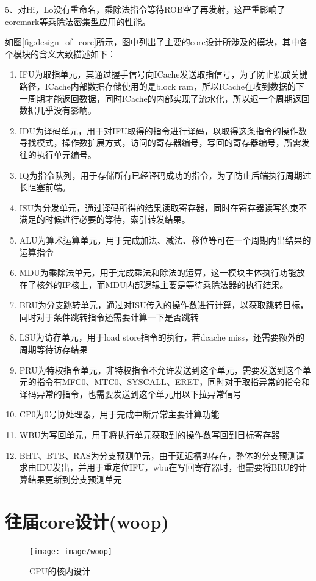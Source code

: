 \documentclass[lang=cn,11pt,a4paper]{elegantpaper}
\begin{document}
5、对Hi，Lo没有重命名，乘除法指令等待ROB空了再发射，这严重影响了coremark等乘除法密集型应用的性能。



如图\ref{fig:design_of_core}所示，图中列出了主要的core设计所涉及的模块，其中各个模块的含义大致描述如下：

\begin{enumerate}
\item IFU为取指单元，其通过握手信号向ICache发送取指信号，为了防止照成关键路径，ICache内部数据存储使用的是block ram，所以ICache在收到数据的下一周期才能返回数据，同时ICache的内部实现了流水化，所以迟一个周期返回数据几乎没有影响。

\item IDU为译码单元，用于对IFU取得的指令进行译码，以取得这条指令的操作数寻找模式，操作数扩展方式，访问的寄存器编号，写回的寄存器编号，所需发往的执行单元编号。

\item IQ为指令队列，用于存储所有已经译码成功的指令，为了防止后端执行周期过长阻塞前端。

\item ISU为分发单元，通过译码所得的结果读取寄存器，同时在寄存器读写约束不满足的时候进行必要的等待，索引转发结果。

\item ALU为算术运算单元，用于完成加法、减法、移位等可在一个周期内出结果的运算指令

\item MDU为乘除法单元，用于完成乘法和除法的运算，这一模块主体执行功能放在了核外的IP核上，而MDU内部逻辑主要是等待乘除法器的执行结果。

\item BRU为分支跳转单元，通过对ISU传入的操作数进行计算，以获取跳转目标，同时对于条件跳转指令还需要计算一下是否跳转

\item LSU为访存单元，用于load store指令的执行，若dcache miss，还需要额外的周期等待访存结果

\item PRU为特权指令单元，非特权指令不允许发送到这个单元，需要发送到这个单元的指令有MFC0、MTC0、SYSCALL、ERET，同时对于取指异常的指令和译码异常的指令，也需要发送到这个单元用以下拉异常信号

\item CP0为0号协处理器，用于完成中断异常主要计算功能

\item WBU为写回单元，用于将执行单元获取到的操作数写回到目标寄存器

\item BHT、BTB、RAS为分支预测单元，由于延迟槽的存在，整体的分支预测请求由IDU发出，并用于重定位IFU，wbu在写回寄存器时，也需要将BRU的计算结果更新到分支预测单元
\end{enumerate}

\section{往届core设计(woop)}

\begin{figure}[htbp]
	\centering
	\texttt{[image: image/woop]}\\
	\caption{CPU的核内设计}\label{fig:design_of_woop_core}
\end{figure}

\newpage

%
%
\end{document}
